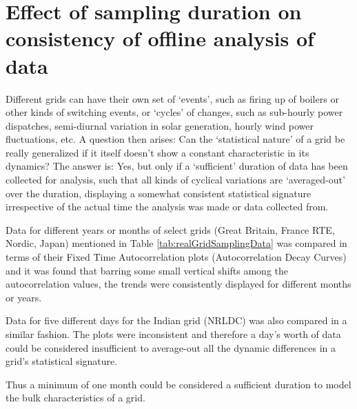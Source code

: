 \appendix

\section{Effect of sampling duration on consistency of offline analysis of data}
\label{app:effectOfSamplingDuration}

Different grids can have their own set of `events', such as firing up of boilers or other kinds of switching events, or `cycles' of changes, such as sub-hourly power dispatches, semi-diurnal variation in solar generation, hourly wind power fluctuations, etc. A question then arises: Can the `statistical nature' of a grid be really generalized if it itself doesn't show a constant characteristic in its dynamics? The answer is: Yes, but only if a `sufficient' duration of data has been collected for analysis, such that all kinds of cyclical variations are `averaged-out' over the duration, displaying a somewhat consistent statistical signature irrespective of the actual time the analysis was made or data collected from.

Data for different years or months of select grids (Great Britain, France RTE, Nordic, Japan) mentioned in Table \ref{tab:realGridSamplingData} was compared in terms of their Fixed Time Autocorrelation plots (Autocorrelation Decay Curves) and it was found that barring some small vertical shifts among the autocorrelation values, the trends were consistently displayed for different months or years. 

Data for five different days for the Indian grid (NRLDC) was also compared in a similar fashion. The plots were inconsistent and therefore a day's worth of data could be considered insufficient to average-out all the dynamic differences in a grid's statistical signature.

Thus a minimum of one month could be considered a sufficient duration to model the bulk characteristics of a grid.




